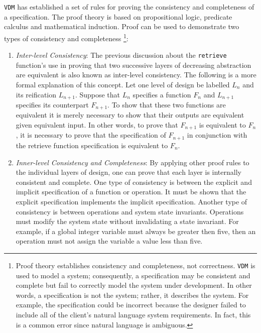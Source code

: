\documentclass[11pt]{article}
\begin{document}
{\tt VDM} has established a set of rules for proving the consistency and completeness of a specification.  The proof theory is based on propositional logic, predicate calculus and mathematical induction.  Proof can be used to demonstrate two types of consistency and completeness \footnote{Proof theory establishes consistency and completeness, not correctness.  {\tt VDM} is used to model a system; consequently, a specification may be consistent and complete but fail to correctly model the system under development.  In other words, a specification is not the system; rather, it describes the system.  For example, the specification could be incorrect because the designer failed to include all of the client's natural language system requirements.  In fact, this is a common error since natural language is ambiguous.}:
\begin{enumerate}
\item {\it Inter-level Consistency}:  The previous discussion about the {\tt retrieve} function's use in proving that two successive layers of decreasing abstraction are equivalent is also known as inter-level consistency.  The following is a more formal explanation of  this concept.  Let one level of design be labelled $L_{n}$ and its reification $L_{n+1}$.  Suppose that $L_{n}$ specifies a function $F_{n}$ and $L_{n+1}$ specifies its counterpart $F_{n+1}$.  To show that these two functions are equivalent it is merely necessary to show that their outputs are equivalent given equivalent input.  In other words, to prove that $F_{n+1}$ is equivalent to $F_{n}$, it is necessary to prove that the specification of $F_{n+1}$ in conjunction with the retrieve function specification is equivalent to $F_{n}$.
\item {\it Inner-level Consistency and Completeness}:  By applying other proof rules to the individual layers of design, one can prove that each layer is internally consistent and complete.  One type of consistency is between the explicit and implicit specification of a function or operation.  It must be shown that the explicit specification implements the implicit specification.  Another type of consistency is between operations and system state invariants.  Operations must modify the system state without invalidating a state invariant.  For example, if a global integer variable must always be greater then five, then an operation must not assign the variable a value less than five.
\end{enumerate}
\end{document}

